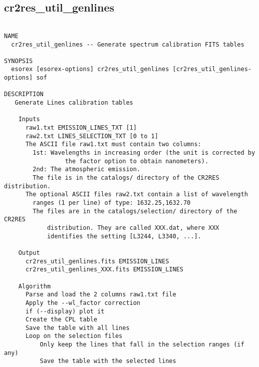 \subsection{cr2res\_util\_genlines}
\begin{verbatim}

NAME
  cr2res_util_genlines -- Generate spectrum calibration FITS tables

SYNOPSIS
  esorex [esorex-options] cr2res_util_genlines [cr2res_util_genlines-options] sof

DESCRIPTION
   Generate Lines calibration tables                                       
                                                                          
    Inputs                                                                
      raw1.txt EMISSION_LINES_TXT [1]                       
      raw2.txt LINES_SELECTION_TXT [0 to 1]                 
      The ASCII file raw1.txt must contain two columns:                   
        1st: Wavelengths in increasing order (the unit is corrected by    
                 the factor option to obtain nanometers).                 
        2nd: The atmospheric emission.                                    
        The file is in the catalogs/ directory of the CR2RES distribution.
      The optional ASCII files raw2.txt contain a list of wavelength      
        ranges (1 per line) of type: 1632.25,1632.70                      
        The files are in the catalogs/selection/ directory of the CR2RES  
            distribution. They are called XXX.dat, where XXX              
            identifies the setting [L3244, L3340, ...].                   
                                                                          
    Output                                                                
      cr2res_util_genlines.fits EMISSION_LINES           
      cr2res_util_genlines_XXX.fits EMISSION_LINES       
                                                                          
    Algorithm                                                             
      Parse and load the 2 columns raw1.txt file                          
      Apply the --wl_factor correction                                    
      if (--display) plot it                                              
      Create the CPL table                                                
      Save the table with all lines                                       
      Loop on the selection files                                         
          Only keep the lines that fall in the selection ranges (if any)  
          Save the table with the selected lines                          
                                                                          

\end{verbatim}
